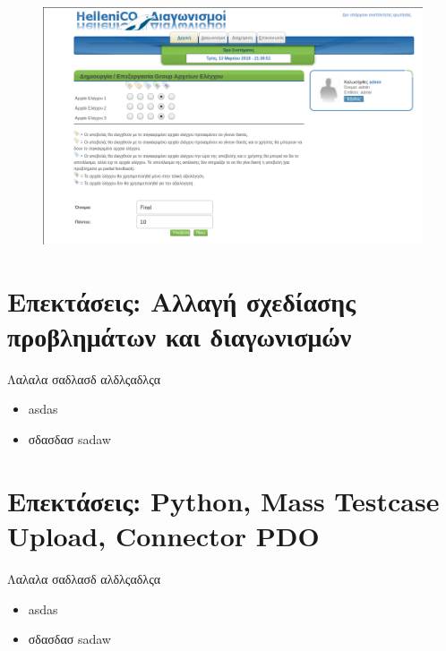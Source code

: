 \documentclass{beamer}
\begin{document}
\begin{frame}
  \frametitle{}
  \begin{figure}

    \includegraphics[scale=0.4,trim=4 4 4 4,clip]{../Figures/groupedit.png}
  \end{figure}
\end{frame}

\section{Επεκτάσεις: Αλλαγή σχεδίασης προβλημάτων και διαγωνισμών}
\begin{frame}
  Λαλαλα σαδλασδ αλδλςαδλςα
  \begin{itemize}
      \item asdas
      \item σδασδασ sadaw
  \end{itemize}
\end{frame}

\section{Επεκτάσεις: Python, Mass Testcase Upload, Connector PDO}
\begin{frame}
  Λαλαλα σαδλασδ αλδλςαδλςα
  \begin{itemize}
      \item asdas
      \item σδασδασ sadaw
  \end{itemize}
\end{frame}
\end{document}
